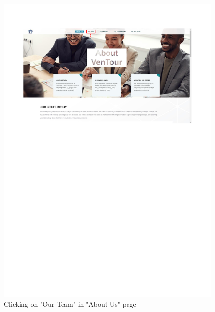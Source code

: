 \documentclass[../../DD.tex]{subfiles}
\begin{document}
            \begin{figure}[!htb]
                \centering
                \includegraphics[width=\textwidth, trim=0 450 0 0, clip]{Images/scenarios/use cases 2.pdf}
                \caption{Clicking on "Our Team" in "About Us" page}
                \label{fig:use_cases_3_2}
            \end{figure}
\end{document}
